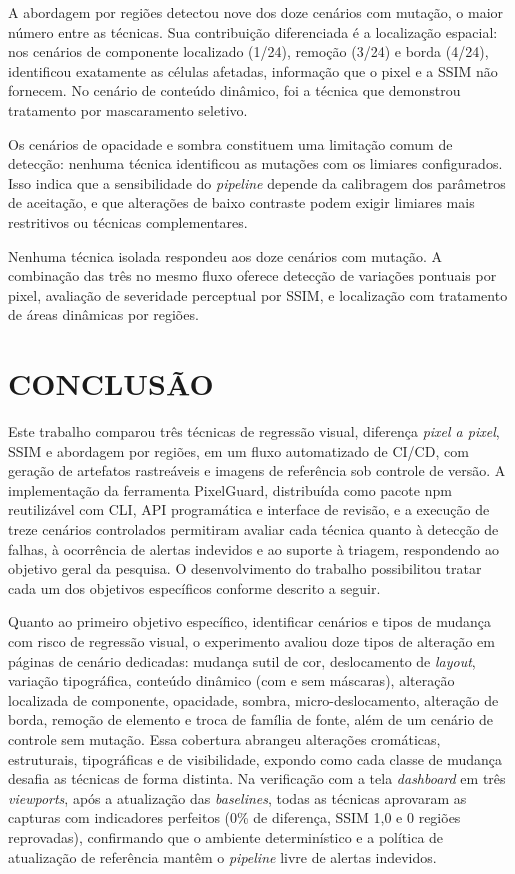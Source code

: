 \documentclass{UNESC}
\begin{document}
A abordagem por regiões detectou nove dos doze cenários com mutação, o maior número entre as técnicas. Sua contribuição diferenciada é a localização espacial: nos cenários de componente localizado (1/24), remoção (3/24) e borda (4/24), identificou exatamente as células afetadas, informação que o pixel e a SSIM não fornecem. No cenário de conteúdo dinâmico, foi a técnica que demonstrou tratamento por mascaramento seletivo.

Os cenários de opacidade e sombra constituem uma limitação comum de detecção: nenhuma técnica identificou as mutações com os limiares configurados. Isso indica que a sensibilidade do \emph{pipeline} depende da calibragem dos parâmetros de aceitação, e que alterações de baixo contraste podem exigir limiares mais restritivos ou técnicas complementares.

Nenhuma técnica isolada respondeu aos doze cenários com mutação. A combinação das três no mesmo fluxo oferece detecção de variações pontuais por pixel, avaliação de severidade perceptual por SSIM, e localização com tratamento de áreas dinâmicas por regiões.

\section{CONCLUSÃO}

Este trabalho comparou três técnicas de regressão visual, diferença \emph{pixel a pixel}, SSIM e abordagem por regiões, em um fluxo automatizado de CI/CD, com geração de artefatos rastreáveis e imagens de referência sob controle de versão. A implementação da ferramenta PixelGuard, distribuída como pacote npm reutilizável com CLI, API programática e interface de revisão, e a execução de treze cenários controlados permitiram avaliar cada técnica quanto à detecção de falhas, à ocorrência de alertas indevidos e ao suporte à triagem, respondendo ao objetivo geral da pesquisa. O desenvolvimento do trabalho possibilitou tratar cada um dos objetivos específicos conforme descrito a seguir.

Quanto ao primeiro objetivo específico, identificar cenários e tipos de mudança com risco de regressão visual, o experimento avaliou doze tipos de alteração em páginas de cenário dedicadas: mudança sutil de cor, deslocamento de \emph{layout}, variação tipográfica, conteúdo dinâmico (com e sem máscaras), alteração localizada de componente, opacidade, sombra, micro-deslocamento, alteração de borda, remoção de elemento e troca de família de fonte, além de um cenário de controle sem mutação. Essa cobertura abrangeu alterações cromáticas, estruturais, tipográficas e de visibilidade, expondo como cada classe de mudança desafia as técnicas de forma distinta. Na verificação com a tela \textit{dashboard} em três \emph{viewports}, após a atualização das \emph{baselines}, todas as técnicas aprovaram as capturas com indicadores perfeitos (0\% de diferença, SSIM 1,0 e 0 regiões reprovadas), confirmando que o ambiente determinístico e a política de atualização de referência mantêm o \emph{pipeline} livre de alertas indevidos.
\end{document}
